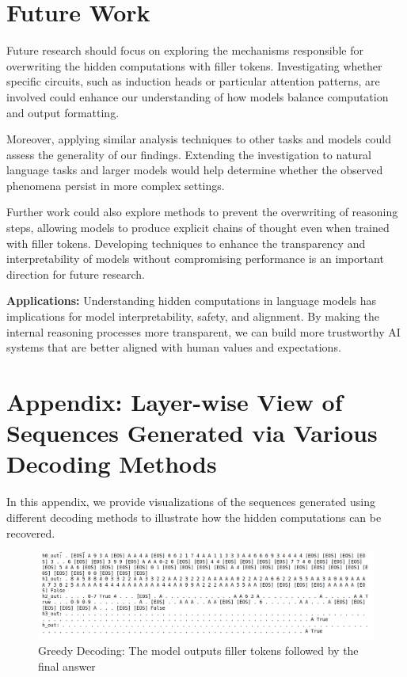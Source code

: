 \documentclass{article}
\begin{document}
\section{Future Work}

Future research should focus on exploring the mechanisms responsible for overwriting the hidden computations with filler tokens. Investigating whether specific circuits, such as induction heads or particular attention patterns, are involved could enhance our understanding of how models balance computation and output formatting.

Moreover, applying similar analysis techniques to other tasks and models could assess the generality of our findings. Extending the investigation to natural language tasks and larger models would help determine whether the observed phenomena persist in more complex settings.

Further work could also explore methods to prevent the overwriting of reasoning steps, allowing models to produce explicit chains of thought even when trained with filler tokens. Developing techniques to enhance the transparency and interpretability of models without compromising performance is an important direction for future research.

\textbf{Applications:} Understanding hidden computations in language models has implications for model interpretability, safety, and alignment. By making the internal reasoning processes more transparent, we can build more trustworthy AI systems that are better aligned with human values and expectations.


\clearpage

\appendix

\section{Appendix: Layer-wise View of Sequences Generated via Various Decoding Methods}

In this appendix, we provide visualizations of the sequences generated using different decoding methods to illustrate how the hidden computations can be recovered.

\begin{figure}[H]
    \centering
    \includegraphics[width=\textwidth]{greedy_decoding.png}
    \caption{Greedy Decoding: The model outputs filler tokens followed by the final answer}
    \label{fig:greedy}
\end{figure}
\end{document}
